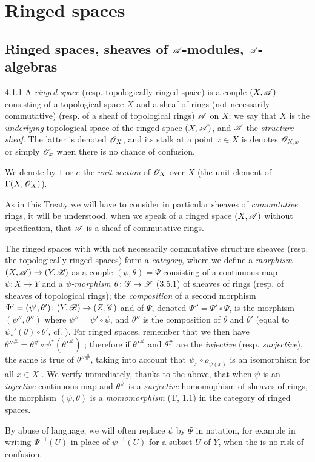 \documentclass{book}
\begin{document}
\section{Ringed spaces}
\label{0-prelim-4}

\subsection{Ringed spaces, sheaves of $\mathscr{A}$-modules, $\mathscr{A}$-algebras}
\label{0-prelim-4.1}

\begin{env}{4.1.1}
\label{env-0.4.1.1}
A \emph{ringed space} (resp. topologically ringed space) is a couple $(X,\mathscr{A})$
consisting of a topological space $X$ and a sheaf of rings (not necessarily commutative)
(resp. of a sheaf of topological rings) $\mathscr{A}$ on $X$; we say that $X$ is the
\emph{underlying} topological space of the ringed space $(X,\mathscr{A})$, and $\mathscr{A}$
the \emph{structure sheaf}. The latter is denoted $\mathscr{O}_X$, and its stalk at a point
$x\in X$ is denotes $\mathscr{O}_{X,x}$ or simply $\mathscr{O}_x$ when there is no chance of confusion.

We denote by $1$ or $e$ the \emph{unit section} of $\mathscr{O}_X$ over $X$ (the unit element
of $\Gamma(X,\mathscr{O}_X)$).

As in this Treaty we will have to consider in particular sheaves of \emph{commutative}
rings, it will be understood, when we speak of a ringed space $(X,\mathscr{A})$ without
specification, that $\mathscr{A}$ is a sheaf of commutative rings.

The ringed spaces with with not necessarily commutative structure sheaves
(resp. the topologically ringed spaces) form a \emph{category}, where we define
a \emph{morphism} $(X,\mathscr{A})\to(Y,\mathscr{B})$ as a couple $(\psi,\theta)=\Psi$
consisting of a continuous map $\psi\colon X\to Y$ and a \emph{$\psi$-morphism}
$\theta\colon\mathscr{G}\to\mathscr{F}$ (3.5.1) of sheaves of rings (resp. of sheaves of
topological rings); the \emph{composition} of a second morphism
$\Psi'=(\psi',\theta')\colon(Y,\mathscr{B})\to(Z,\mathscr{C})$ and of $\Psi$, denoted
$\Psi''=\Psi'\circ\Psi$, is the morphism $(\psi'',\theta'')$ where $\psi''=\psi'\circ\psi$,
and $\theta''$ is the composition of $\theta$ and $\theta'$ (equal to
$\psi_\ast'(\theta)\circ\theta'$, cf. ). For ringed spaces, remember that we
then have ${\theta''}^\#=\theta^\#\circ\psi^\ast({\theta'}^\#)$ ; therefore
if ${\theta'}^\#$ and $\theta^\#$ are the \emph{injective} (resp. \emph{surjective}),
the same is true of ${\theta''}^\#$, taking into account that $\psi_x\circ\rho_{\psi(x)}$
is an isomorphism for all $x\in X$ . We verify immediately, thanks to the
above, that when $\psi$ is an \emph{injective} continuous map and $\theta^\#$ is
a \emph{surjective} homomophism of sheaves of rings, the morphism $(\psi,\theta)$ is
a \emph{momomorphism} (T, 1.1) in the category of ringed spaces.

By abuse of language, we will often replace $\psi$ by $\Psi$ in notation, for
example in writing $\Psi^{-1}(U)$ in place of $\psi^{-1}(U)$ for a subset $U$ of $Y$,
when the is no risk of confusion.
\end{env}
\end{document}
